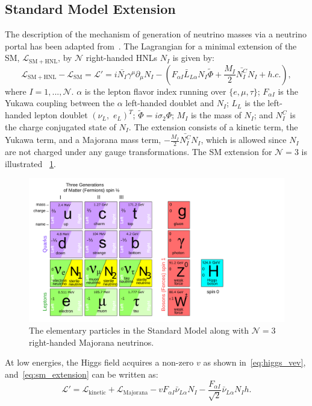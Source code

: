 \subsection{Standard Model Extension}
The description of the mechanism of generation of neutrino masses via a neutrino portal has been adapted from~\cite{Alekhin2016}. The Lagrangian for a minimal extension of the SM, $\mathcal{L_\mathrm{SM+HNL}}$, by $\mathcal{N}$ right-handed HNLs $N_I$ is given by:
\begin{equation}\label{eq:sm_extension}
    \mathcal{L_\mathrm{SM+HNL}}-\mathcal{L_\mathrm{SM}}=\mathcal{L}'= 
    i\bar{N_I}\gamma^\mu \partial_\mu N_I - \left( F_{\alpha I}\bar{L}_{L\alpha}N_I\tilde{\Phi} + \frac{M_I}{2}\bar{N_I^C} N_I + h.c.  \right),
\end{equation}
where $I=1,...,\mathcal{N}$. $\alpha$ is the lepton flavor index running over $\{e, \mu, \tau\}$; $F_{\alpha I}$ is the Yukawa coupling between the $\alpha$ left-handed doublet and $N_I$; $L_L$ is the left-handed lepton doublet $(\nu_L,\,\,e_L)^T$; $\tilde{\Phi}=i\sigma_2\Phi$; $M_I$ is the mass of $N_I$; and $N^C_I$ is the charge conjugated state of $N_I$. The extension consists of a kinetic term, the Yukawa term, and a Majorana mass term, $-\frac{M_I}{2}\bar{N_I^C} N_I$, which is allowed since $N_I$ are not charged under any gauge transformations. The SM extension for $\mathcal{N}=3$ is illustrated ~\cref{fig:sm_extended}.

\begin{figure}[!th]
    \centering
    \includegraphics[width=.8\linewidth]{figures/theory/SM_with_HNL.pdf}
    \caption{The elementary particles in the Standard Model along with $\mathcal{N}=3$ right-handed Majorana neutrinos.~\cite{Gninenko2012}}
    \label{fig:sm_extended}
\end{figure}

At low energies, the Higgs field acquires a non-zero $v$ as shown in~\cref{eq:higgs_vev}, and~\cref{eq:sm_extension} can be written as:
\begin{equation}
    \mathcal{L}'=\mathcal{L}_\mathrm{kinetic}+\mathcal{L}_\mathrm{Majorana}-vF_{\alpha I}\bar{\nu}_{L\alpha}N_I - \frac{F_{\alpha I}}{\sqrt{2}}\bar{\nu}_{L\alpha}N_I h.
\end{equation}

